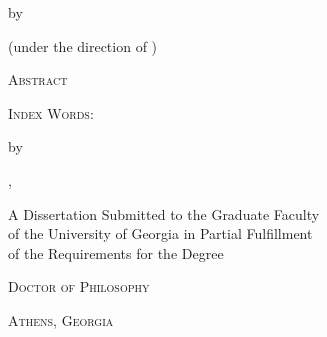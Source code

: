 \documentclass[dissertation.tex]{subfiles}
\begin{document}

\begingroup
\thispagestyle{empty}
\centering

\vspace*{0.75in}
\Large \textsc{\mydissertationtitle}

\vspace{1cm}
\large by

\vspace{1cm}
\textsc{\myname}

\vspace{1cm}
\normalsize
(under the direction of \myadvisor)

\vspace{2cm}
\large
\textsc{Abstract}

\endgroup

\noindent



\vspace{\fill}
\noindent
\textsc{Index Words:}


\pagebreak


\begingroup
\thispagestyle{empty}
\centering

\vspace*{1cm}
\Large \textsc{\mydissertationtitle}

\vspace{1cm}
\large by

\vspace{1cm}
\textsc{\myname}

\vspace{1cm}
\mycollegedegree{} \mycollege, \mycollegegradyear

\vspace{3cm}
\normalsize
A Dissertation Submitted to the Graduate Faculty\\of the University of Georgia in Partial Fulfillment\\of the Requirements for the Degree

\vspace{1cm}
\textsc{Doctor of Philosophy}

\vspace{\fill}
\textsc{Athens, Georgia}

\mysubmissionyear

\endgroup
\pagebreak

\begingroup
\thispagestyle{empty}
\vspace*{\fill}
\centering

\textcopyright{} \mysubmissionyear
\end{document}
